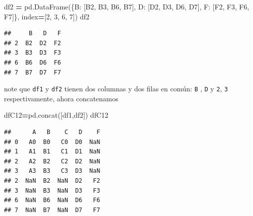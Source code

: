 \documentclass[
]{book}
\newenvironment{Shaded}{\begin{snugshade}}{\end{snugshade}}
\newcommand{\DecValTok}[1]{\textcolor[rgb]{0.00,0.00,0.81}{#1}}
\newcommand{\NormalTok}[1]{#1}
\newcommand{\OperatorTok}[1]{\textcolor[rgb]{0.81,0.36,0.00}{\textbf{#1}}}
\newcommand{\StringTok}[1]{\textcolor[rgb]{0.31,0.60,0.02}{#1}}
\theoremstyle{definition}
\theoremstyle{definition}
\theoremstyle{definition}
\theoremstyle{definition}
\theoremstyle{remark}
\begin{document}
\begin{Shaded}
\begin{Highlighting}[]
\NormalTok{df2 }\OperatorTok{=}\NormalTok{ pd.DataFrame(\{}\StringTok{\textquotesingle{}B\textquotesingle{}}\NormalTok{: [}\StringTok{\textquotesingle{}B2\textquotesingle{}}\NormalTok{, }\StringTok{\textquotesingle{}B3\textquotesingle{}}\NormalTok{, }\StringTok{\textquotesingle{}B6\textquotesingle{}}\NormalTok{, }\StringTok{\textquotesingle{}B7\textquotesingle{}}\NormalTok{],}
                    \StringTok{\textquotesingle{}D\textquotesingle{}}\NormalTok{: [}\StringTok{\textquotesingle{}D2\textquotesingle{}}\NormalTok{, }\StringTok{\textquotesingle{}D3\textquotesingle{}}\NormalTok{, }\StringTok{\textquotesingle{}D6\textquotesingle{}}\NormalTok{, }\StringTok{\textquotesingle{}D7\textquotesingle{}}\NormalTok{],}
                    \StringTok{\textquotesingle{}F\textquotesingle{}}\NormalTok{: [}\StringTok{\textquotesingle{}F2\textquotesingle{}}\NormalTok{, }\StringTok{\textquotesingle{}F3\textquotesingle{}}\NormalTok{, }\StringTok{\textquotesingle{}F6\textquotesingle{}}\NormalTok{, }\StringTok{\textquotesingle{}F7\textquotesingle{}}\NormalTok{]\},}
\NormalTok{                         index}\OperatorTok{=}\NormalTok{[}\DecValTok{2}\NormalTok{, }\DecValTok{3}\NormalTok{, }\DecValTok{6}\NormalTok{, }\DecValTok{7}\NormalTok{])}
\NormalTok{df2}
\end{Highlighting}
\end{Shaded}

\begin{verbatim}
##     B   D   F
## 2  B2  D2  F2
## 3  B3  D3  F3
## 6  B6  D6  F6
## 7  B7  D7  F7
\end{verbatim}

note que \texttt{df1} y \texttt{df2} tienen dos columnas y dos filas en común: \texttt{B} , \texttt{D} y \texttt{2}, \texttt{3} respectivamente, ahora concatenamos

\begin{Shaded}
\begin{Highlighting}[]
\NormalTok{dfC12}\OperatorTok{=}\NormalTok{pd.concat([df1,df2])   }
\NormalTok{dfC12}
\end{Highlighting}
\end{Shaded}

\begin{verbatim}
##      A   B    C   D    F
## 0   A0  B0   C0  D0  NaN
## 1   A1  B1   C1  D1  NaN
## 2   A2  B2   C2  D2  NaN
## 3   A3  B3   C3  D3  NaN
## 2  NaN  B2  NaN  D2   F2
## 3  NaN  B3  NaN  D3   F3
## 6  NaN  B6  NaN  D6   F6
## 7  NaN  B7  NaN  D7   F7
\end{verbatim}
\end{document}
